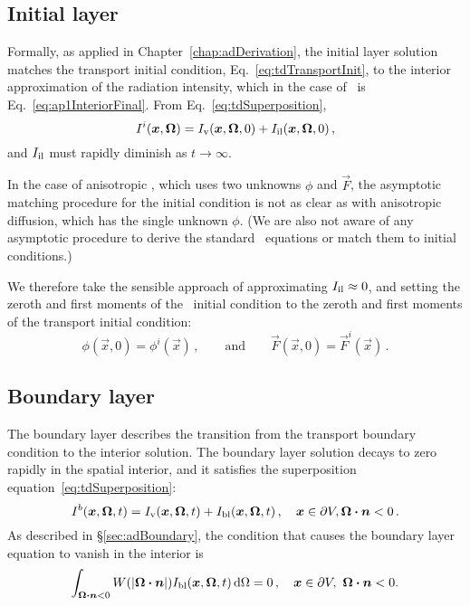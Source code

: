 \subsection{Initial layer}

Formally, as applied in Chapter~\ref{chap:adDerivation}, the initial layer
solution matches the transport initial condition,
Eq.~\eqref{eq:tdTransportInit}, to the interior approximation of the radiation
intensity, which in the case of \APone\ is Eq.~\eqref{eq:ap1InteriorFinal}. From
Eq.~\eqref{eq:tdSuperposition}, 
\begin{equation*}
  I^i(\bm{x},\bm{\Omega})
  = I_\mathrm{v}(\bm{x},\bm{\Omega},0) + I_\mathrm{il}(\bm{x},\bm{\Omega},0)\,,
\end{equation*}
and $I_\mathrm{il}$ must rapidly diminish as $t\to\infty$.

In the case of anisotropic \Pone, which uses two unknowns $\phi$ and
$\vec{F}$, the asymptotic matching procedure for the initial condition is not as
clear as with anisotropic diffusion, which has the single unknown $\phi$. (We
are also not aware of any asymptotic procedure to derive the standard \Pone\
equations or match them to initial conditions.)

We therefore take the sensible approach of approximating $I_\mathrm{il}\approx0$, and
setting the zeroth and first moments of the \APone\ initial condition to the
zeroth and first moments of the transport initial condition:
\begin{equation}\label{eq:ap1init}
  \phi(\vec{x},0) = \phi^i(\vec{x}) \,,\qquad\text{and}\qquad
  \vec{F}(\vec{x},0) = \vec{F}^i(\vec{x}) \,.
\end{equation}

\subsection{Boundary layer}

The boundary layer describes the transition from the transport boundary
condition to the interior solution. The boundary layer solution decays to zero
rapidly in the spatial interior, and it satisfies the superposition
equation~\eqref{eq:tdSuperposition}:
\begin{equation*}
  I^b(\bm{x},\bm{\Omega},t)
  = I_\mathrm{v}(\bm{x},\bm{\Omega},t) + I_\mathrm{bl}(\bm{x},\bm{\Omega},t)\,,
  \quad \bm{x}\in \partial V, \bm{\Omega}\bm{\cdot} \bm{n} < 0\,.
\end{equation*}
As described in \S\ref{sec:adBoundary}, the condition that causes the boundary
layer equation to vanish in the interior is 
\begin{equation}\tagref{eq:tdKillBndy}
  \int_{\vec{\Omega}\vd\vec{n} < 0}
  W(\abs{\vec{\Omega}\vd\vec{n}}) \Ibl(\vec{x},\vec{\Omega},t) \ud\Omega
  = 0\,,
  \quad \vec{x}\in \partial V ,\ \vec{\Omega}\vd \vec{n} < 0.
\end{equation}

